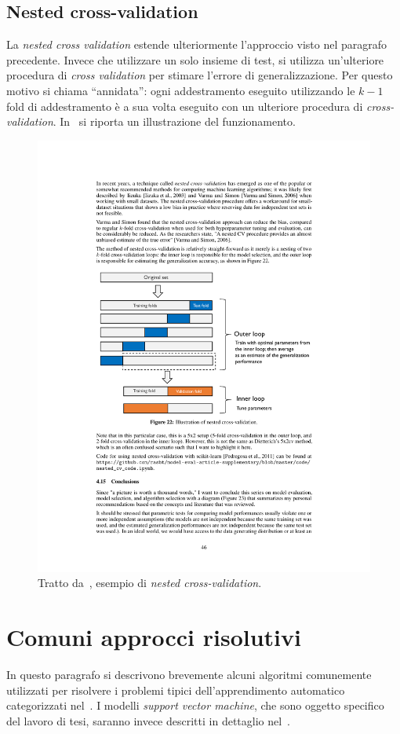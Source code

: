 \subsection{Nested cross-validation}
La \emph{nested cross validation} estende ulteriormente l'approccio visto nel paragrafo precedente.
Invece che utilizzare un solo insieme di test, si utilizza un'ulteriore procedura di \emph{cross validation} per stimare l'errore di generalizzazione.
Per questo motivo si chiama ``annidata'': ogni addestramento eseguito utilizzando le $k-1$ fold di addestramento è a sua volta eseguito con un ulteriore procedura di \emph{cross-validation}.
In~ si riporta un illustrazione del funzionamento.
\begin{figure}
    \centering
    \includegraphics[width=0.8\linewidth]{img/nested_cv.pdf}
    \caption[Esempio \emph{nested cross-validation}.]{Tratto da~\cite{model_evaluation}, esempio di \emph{nested cross-validation}.}
    \label{fig:nested_cv}
\end{figure}

\section{Comuni approcci risolutivi}\label{sec:comuni_approcci_risolutivi}
In questo paragrafo si descrivono brevemente alcuni algoritmi comunemente utilizzati per risolvere i problemi tipici dell'apprendimento automatico categorizzati nel~.
I modelli \emph{support vector machine}, che sono oggetto specifico del lavoro di tesi, saranno invece descritti in dettaglio nel~.

